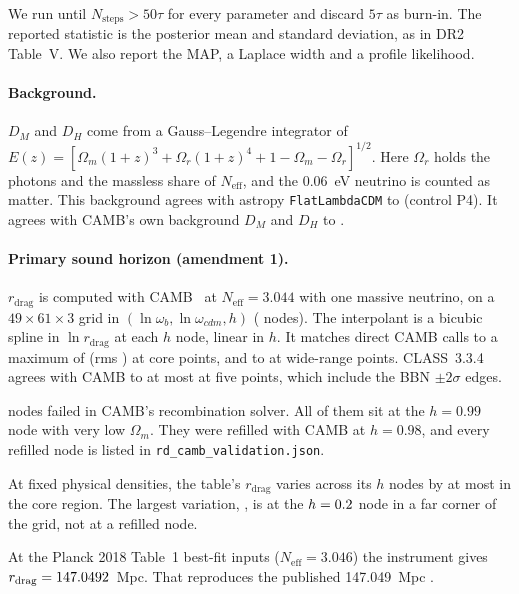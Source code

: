 \documentclass[11pt]{article}
\begin{document}
We run until $N_\mathrm{steps}>50\tau$ for every parameter and discard
$5\tau$ as burn-in. The reported statistic is the posterior mean and
standard deviation, as in DR2 Table~V. We also report the MAP, a Laplace
width and a profile likelihood.

\paragraph{Background.}
$D_M$ and $D_H$ come from a Gauss--Legendre integrator of
$E(z)=[\Omega_m(1+z)^3+\Omega_r(1+z)^4+1-\Omega_m-\Omega_r]^{1/2}$. Here
$\Omega_r$ holds the photons and the massless share of $N_\mathrm{eff}$,
and the 0.06~eV neutrino is counted as matter. This background agrees with
astropy \texttt{FlatLambdaCDM} to \PFour{} (control P4). It agrees with
CAMB's own background $D_M$ and $D_H$ to \BgMax{}.

\paragraph{Primary sound horizon (amendment 1).}
$r_\mathrm{drag}$ is computed with CAMB~\CambVer{} at $N_\mathrm{eff}=3.044$
with one massive neutrino, on a $49\times61\times3$ grid in
$(\ln\omega_b,\ln\omega_{cdm},h)$ (\NGrid{} nodes). The interpolant is a
bicubic spline in $\ln r_\mathrm{drag}$ at each $h$ node, linear in $h$.
It matches direct CAMB calls to a maximum of \InterpCoreMax{} (rms
\InterpCoreRms{}) at \InterpCoreN{} core points, and to \InterpWideMax{}
at \InterpWideN{} wide-range points. CLASS~3.3.4 agrees with CAMB to at
most \ClassMax{} at five points, which include the BBN $\pm2\sigma$ edges.

\NSubst{} nodes failed in CAMB's recombination solver. All of them sit at
the $h=0.99$ node with very low $\Omega_m$. They were refilled with CAMB at
$h=0.98$, and every refilled node is listed in
\texttt{rd\_camb\_validation.json}.

At fixed physical densities, the table's $r_\mathrm{drag}$ varies across
its $h$ nodes by at most \HDepCore{} in the core region. The largest
variation, \HDep, is at the $h=0.2$ node in a far corner of the grid,
not at a refilled node.

At the Planck 2018 Table~1 best-fit inputs ($N_\mathrm{eff}=3.046$) the
instrument gives $r_\mathrm{drag}=147.0492$~Mpc. That reproduces the
published 147.049~Mpc \cite{planck2018}.
\end{document}
